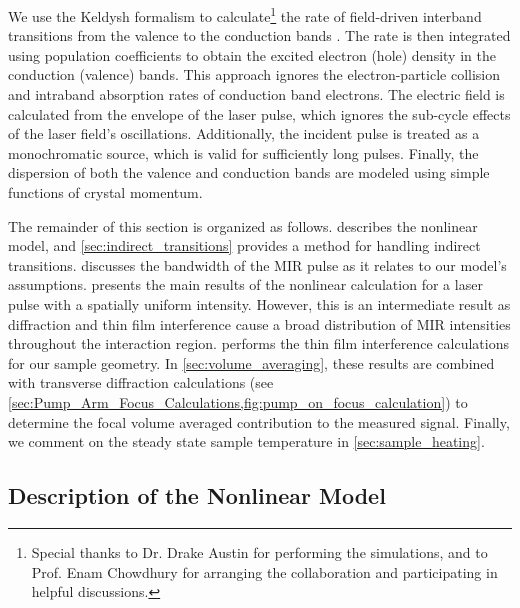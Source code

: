 We use the Keldysh formalism to calculate\footnote{Special thanks to Dr. Drake Austin for performing the simulations, and to Prof. Enam Chowdhury for arranging the collaboration and participating in helpful discussions.} the rate of field-driven interband transitions from the valence to the conduction bands \cite{sergaevaUltrafastExcitationConductionband2018,keldyshIonizationFieldStrong1965,vpopruzhenkoKeldyshTheoryStrong2014}. The rate is then integrated using population coefficients to obtain the excited electron (hole) density in the conduction (valence) bands. This approach ignores the electron-particle collision and intraband absorption rates of conduction band electrons. The electric field is calculated from the envelope of the laser pulse, which ignores the sub-cycle effects of the laser field's oscillations. Additionally, the incident pulse is treated as a monochromatic source, which is valid for sufficiently long pulses. Finally, the dispersion of both the valence and conduction bands are modeled using simple functions of crystal momentum.

The remainder of this section is organized as follows.  describes the nonlinear model, and \cref{sec:indirect_transitions} provides a method for handling indirect transitions.  discusses the bandwidth of the MIR pulse as it relates to our model's assumptions.  presents the main results of the nonlinear calculation for a laser pulse with a spatially uniform intensity. However, this is an intermediate result as diffraction and thin film interference cause a broad distribution of MIR intensities throughout the interaction region.  performs the thin film interference calculations for our sample geometry. In \cref{sec:volume_averaging}, these results are combined with transverse diffraction calculations (see \cref{sec:Pump_Arm_Focus_Calculations,fig:pump_on_focus_calculation}) to determine the focal volume averaged contribution to the measured signal. Finally, we comment on the steady state sample temperature in \cref{sec:sample_heating}.

\subsection{Description of the Nonlinear Model}
\label{sec:nonlinear_excitation_model_details}

